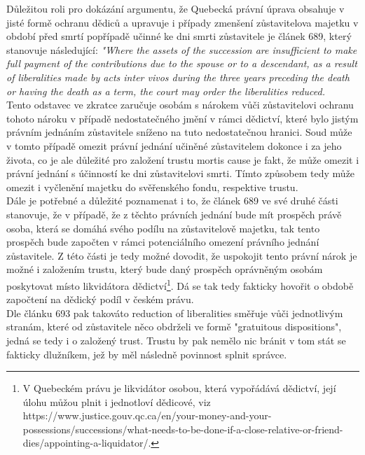 \documentclass{article}
\begin{document}
Důležitou roli pro dokázání argumentu, že Quebecká právní úprava obsahuje v jisté formě ochranu dědiců a upravuje i případy zmenšení zůstavitelova majetku v období před smrtí popřípadě učinné ke dni smrti zůstavitele je článek 689, který stanovuje následující: \textit{"Where the assets of the succession are insufficient to make full payment of the contributions due to the spouse or to a descendant, as a result of liberalities made by acts inter vivos during the three years preceding the death or having the death as a term, the court may order the liberalities reduced.}\\ 

Tento odstavec ve zkratce zaručuje osobám s nárokem vůči zůstavitelovi ochranu tohoto nároku v případě nedostatečného jmění v rámci dědictví, které bylo jistým právním jednáním zůstavitele sníženo na tuto nedostatečnou hranici. Soud může v tomto případě omezit právní jednání učiněné zůstavitelem dokonce i za jeho života, co je ale důležité pro založení trustu mortis cause je fakt, že může omezit i právní jednání s účinností ke dni zůstavitelovi smrti. Tímto způsobem tedy může omezit i vyčlenění majetku do svěřenského fondu, respektive trustu. \\

Dále je potřebné a důležité poznamenat i to, že článek 689 ve své druhé části stanovuje, že v případě, že z těchto právních jednání bude mít prospěch právě osoba, která se domáhá svého podílu na zůstavitelově majetku, tak tento prospěch bude započten v rámci potenciálního omezení právního jednání zůstavitele. Z této části je tedy možné dovodit, že uspokojit tento právní nárok je možné i založením trustu, který bude daný prospěch oprávněným osobám poskytovat místo likvidátora dědictví\footnote{V Quebeckém právu je likvidátor osobou, která vypořádává dědictví, její úlohu můžou plnit i jednotloví dědicové, viz https://www.justice.gouv.qc.ca/en/your-money-and-your-possessions/successions/what-needs-to-be-done-if-a-close-relative-or-friend-dies/appointing-a-liquidator/.}. Dá se tak tedy fakticky hovořit o obdobě započtení na dědický podíl v českém právu.\\

Dle článku 693 pak takováto reduction of liberalities směřuje vůči jednotlivým stranám, které od zůstavitele něco obdrželi ve formě "gratuitous dispositions", jedná se tedy i o založený trust. Trustu by pak nemělo nic bránit v tom stát se fakticky dlužníkem, jež by měl následně povinnost splnit správce.\\
\end{document}
